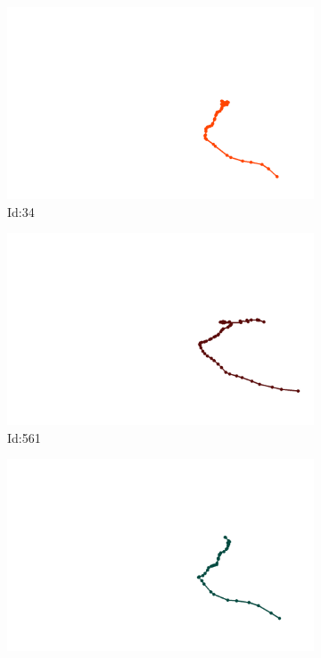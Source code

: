 \documentclass[12pt,twoside]{report}
\begin{document}
\begin{figure}
\centering
\begin{subfigure}[b]{0.20\textwidth}
\centering
\includegraphics[width=\textwidth]{../../trajectories/34.png}
\caption{Id:34}
\end{subfigure}
\begin{subfigure}[b]{0.20\textwidth}
\centering
\includegraphics[width=\textwidth]{../../trajectories/561.png}
\caption{Id:561}
\end{subfigure}
\begin{subfigure}[b]{0.20\textwidth}
\centering
\includegraphics[width=\textwidth]{../../trajectories/566.png}

\end{subfigure}
\end{figure}
\end{document}
